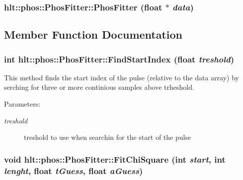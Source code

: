 \subsubsection{\setlength{\rightskip}{0pt plus 5cm}hlt::phos::Phos\-Fitter::Phos\-Fitter (float $\ast$ {\em data})}\label{classhlt_1_1phos_1_1PhosFitter_a2}




\subsection{Member Function Documentation}
\subsubsection{\setlength{\rightskip}{0pt plus 5cm}int hlt::phos::Phos\-Fitter::Find\-Start\-Index (float {\em treshold})}\label{classhlt_1_1phos_1_1PhosFitter_a10}


This method finds the start index of the pulse (relative to the data array) by serching for three or more continious samples above trheshold. \begin{Desc}
\item[Parameters:]
\begin{description}
\item[{\em treshold}]treshold to use when searchin for the start of the pulse \end{description}
\end{Desc}
\subsubsection{\setlength{\rightskip}{0pt plus 5cm}void hlt::phos::Phos\-Fitter::Fit\-Chi\-Square (int {\em start}, int {\em lenght}, float {\em t\-Guess}, float {\em a\-Guess})}\label{classhlt_1_1phos_1_1PhosFitter_a7}


